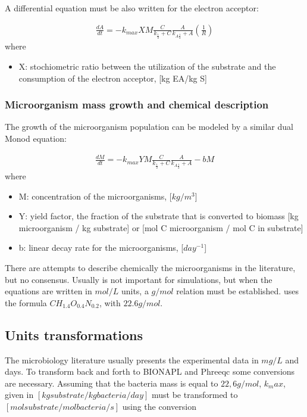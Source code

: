 \documentclass[12pt,twoside]{report}
\begin{document}
A differential equation must be also written for the electron acceptor:

\begin{align}
\frac{dA}{dt} = - k_{max} X M \frac{C}{k_{\frac{1}{2}} + C}\frac{A}{k_{A\frac{1}{2}} + A} \left( \frac{1}{R}\right)
\end{align}
 where 
\begin{itemize}
\item X: stochiometric ratio between the utilization of the substrate and the consumption of the electron acceptor, [kg EA/kg S]
\end{itemize}

\subsubsection{Microorganism mass growth and chemical description}
The growth of the microorganism population can be modeled by a similar dual Monod equation: 

\begin{align}
\frac{dM}{dt} = - k_{max} Y M \frac{C}{k_{\frac{1}{2}} + C}\frac{A}{k_{A\frac{1}{2}} + A} - bM
\end{align}
where
\begin{itemize}
\item M: concentration of the microorganisms, [$kg/m^{3}$]
\item Y: yield factor, the fraction of the substrate that is converted to biomass [kg microorganism / kg substrate] or [mol C microorganism / mol C in substrate]
\item b: linear decay rate for the microorganisms, [$day^{-1}$]
\end{itemize}

There are attempts to describe chemically the microorganisms in the literature, but no consensus. Usually is not important for simulations, but when the equations are written in $mol/L$ units, a $g/mol$ relation must be established. \cite{appelo} uses the formula $CH_{1.4}O_{0.4}N_{0.2}$, with $22.6 g/mol$. 

\subsection{Units transformations}
The microbiology literature usually presents the experimental data in $mg/L$ and days. To transform back and forth to BIONAPL and Phreeqc some conversions are necessary. Assuming that the bacteria mass is equal to $22,6 g/mol$, $k_max$, given in $[kg substrate / kg bacteria/day]$ must be transformed to $[mol substrate/ mol bacteria/s]$ using the conversion
\end{document}
